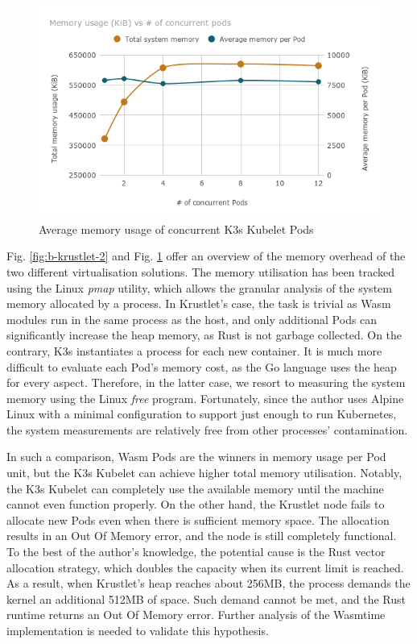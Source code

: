 \begin{figure}[ht]
\centering
\includegraphics[width=\columnwidth]{figures/b-krustlet-3}
\caption{Average memory usage of concurrent K3s Kubelet Pods \label{fig:b-krustlet-3}}
\end{figure}

Fig. \ref{fig:b-krustlet-2} and Fig. \ref{fig:b-krustlet-3} offer an overview of the memory overhead of the two different virtualisation solutions. The memory utilisation has been tracked using the Linux \emph{pmap} utility, which allows the granular analysis of the system memory allocated by a process. In Krustlet's case, the task is trivial as Wasm modules run in the same process as the host, and only additional Pods can significantly increase the heap memory, as Rust is not garbage collected. On the contrary, K3s instantiates a process for each new container. It is much more difficult to evaluate each Pod's memory cost, as the Go language uses the heap for every aspect. Therefore, in the latter case, we resort to measuring the system memory using the Linux \emph{free} program. Fortunately, since the author uses Alpine Linux with a minimal configuration to support just enough to run Kubernetes, the system measurements are relatively free from other processes' contamination.

In such a comparison, Wasm Pods are the winners in memory usage per Pod unit, but the K3s Kubelet can achieve higher total memory utilisation. Notably, the K3s Kubelet can completely use the available memory until the machine cannot even function properly. On the other hand, the Krustlet node fails to allocate new Pods even when there is sufficient memory space. The allocation results in an Out Of Memory error, and the node is still completely functional. To the best of the author's knowledge, the potential cause is the Rust vector allocation strategy, which doubles the capacity when its current limit is reached. As a result, when Krustlet's heap reaches about 256MB, the process demands the kernel an additional 512MB of space. Such demand cannot be met, and the Rust runtime returns an Out Of Memory error. Further analysis of the Wasmtime implementation is needed to validate this hypothesis. 


